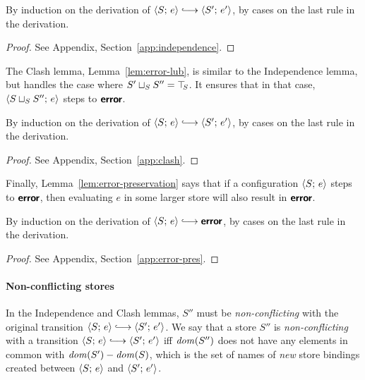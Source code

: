 \LemIndependence

\ifx\fulltr\undefined
\begin{proofsketch}
  By induction on the derivation of $\config{S}{e}
  \parstepsto \config{S'}{e'}$, by cases on the last rule in the
  derivation.
\end{proofsketch}
\else
\begin{proof}
See Appendix, Section~\ref{app:independence}.
\end{proof}
\fi

\noindent The Clash lemma, Lemma~\ref{lem:error-lub}, is similar to the
Independence lemma, but handles the case where $S' \sqcup_{S} S'' =
\top\hspace{-0.85mm}_{S}$.  It ensures that in that case, $\langle S \sqcup_{S} S'';\, e \rangle$
steps to $\textbf{\textsf{error}}$.

\LemClash
\ifx\fulltr\undefined
\begin{proofsketch}
  By induction on the derivation of $\config{S}{e}
  \parstepsto \config{S'}{e'}$, by cases on the last rule in the
  derivation.
\end{proofsketch}
\else
\begin{proof}
See Appendix, Section~\ref{app:clash}.
\end{proof}
\fi

\noindent Finally, Lemma~\ref{lem:error-preservation} says that if a
configuration $\langle S;\, e \rangle$ steps to $\textbf{\textsf{error}}$, then evaluating $e$
in some larger store will also result in $\textbf{\textsf{error}}$.

\LemErrorPreservation
\ifx\fulltr\undefined
\begin{proofsketch}
  By induction on the derivation of $\config{S}{e}
  \parstepsto \error$, by cases on the last rule in the derivation.
\end{proofsketch}
\else
\begin{proof}
See Appendix, Section~\ref{app:error-pres}.
\end{proof}
\fi

\paragraph{Non-conflicting stores}

In the Independence and Clash lemmas, $S''$ must be \emph{non-conflicting} with
the original transition $\config{S}{e} \parstepsto \config{S'}{e'}$.
We say that a store $S''$ is \emph{non-conflicting} with a
transition $\config{S}{e} \parstepsto \config{S'}{e'}$ iff $\mathit{dom}(S'')$
does not have any elements in common with $\mathit{dom}(S') - \mathit{dom}(S)$, which
is the set of names of \emph{new} store bindings created between
$\langle S;\, e \rangle$ and $\langle S';\, e' \rangle$.

